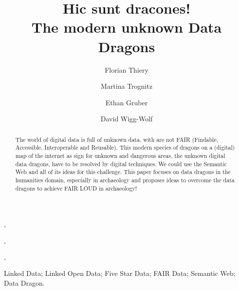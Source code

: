 \documentclass[twocolumn]{autart}
\begin{document}

\begin{frontmatter}

\title{Hic sunt dracones! \protect\\ The modern unknown Data Dragons}
                                               

\author[FT]{Florian Thiery},\author[MT]{Martina Trognitz},\author[EG]{Ethan Gruber},\author[DWW]{David Wigg-Wolf}

\address[FT]{ORCID: 0000-0002-3246-3531 \protect\\ R\"omisch-Germanisches Zentralmuseum, Mainz, Germany}                                        

\address[MT]{ORCID: 0000-0003-0485-6861 \protect\\ Austrian Centre for Digital Humanities at Austrian Academy of Sciences, Austria}

\address[EG]{ORCID: 0000-0002-4691-9747 \protect\\ American Numismatic Society, USA}

\address[DWW]{ORCID: 0000-0002-8604-544X \protect\\ R\"omisch-Germanische Kommission des Deutschen Arch\"aologischen Instituts, Germany}

          
\begin{keyword}                             
Linked Data; Linked Open Data; Five Star Data; FAIR Data; Semantic Web; Data Dragon. 
\end{keyword}

\begin{abstract}                         

The world of digital data is full of unknown data, with are not FAIR (Findable, Accessible, Interoperable and Reusable). This modern species of dragons on a (digital) map of the internet as sign for unknown and dangerous areas, the unknown digital data dragons, have to be resolved by digital techniques. We could use the Semantic Web and all of its ideas for this challenge. This paper focuses on data dragons in the humanities domain, especially in archaeology and proposes ideas to overcome the data dragons to achieve FAIR LOUD in archaeology!

\end{abstract}

\end{frontmatter}
\end{document}
